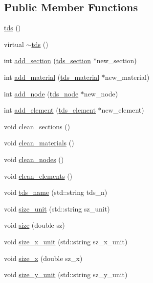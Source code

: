 \subsection*{Public Member Functions}
\begin{DoxyCompactItemize}
\item 
\hyperlink{classtds_a95c4027805a390a3031e9f52c08b89f0}{tds} ()
\item 
virtual \hyperlink{classtds_a192a8e8e17858b5408ba861b5dbfda82}{$\sim$tds} ()
\item 
int \hyperlink{classtds_abf92c8206a518017c40b9ab90eb5deb7}{add\+\_\+section} (\hyperlink{classtds__section}{tds\+\_\+section} $\ast$new\+\_\+section)
\item 
int \hyperlink{classtds_a105e3ea7b76d2da010923997324d1ec5}{add\+\_\+material} (\hyperlink{classtds__material}{tds\+\_\+material} $\ast$new\+\_\+material)
\item 
int \hyperlink{classtds_ab2be727bb6fb9ef9d880a62f5daabf32}{add\+\_\+node} (\hyperlink{classtds__node}{tds\+\_\+node} $\ast$new\+\_\+node)
\item 
int \hyperlink{classtds_aaf8d4e16284b4ac180b75828e2383ead}{add\+\_\+element} (\hyperlink{classtds__element}{tds\+\_\+element} $\ast$new\+\_\+element)
\item 
void \hyperlink{classtds_ad3be7939df63ea2147cb366504402950}{clean\+\_\+sections} ()
\item 
void \hyperlink{classtds_a9e124ba1f8612c881488915d4c7b1c5c}{clean\+\_\+materials} ()
\item 
void \hyperlink{classtds_ab225f20bb630a653f97de352c7f0fb99}{clean\+\_\+nodes} ()
\item 
void \hyperlink{classtds_a094622b47f168c579828e9c6743d5be7}{clean\+\_\+elements} ()
\item 
void \hyperlink{classtds_a4360dd60cf389359a50440d00d21b41f}{tds\+\_\+name} (std\+::string tds\+\_\+n)
\item 
void \hyperlink{classtds_a0ef1c70e8139e2f59d0234679e630346}{size\+\_\+unit} (std\+::string sz\+\_\+unit)
\item 
void \hyperlink{classtds_a409d0e3f35ba795307398c6ff60f2fc9}{size} (double sz)
\item 
void \hyperlink{classtds_a07deb94fcc9d489bfcdfbe7af2675fa4}{size\+\_\+x\+\_\+unit} (std\+::string sz\+\_\+x\+\_\+unit)
\item 
void \hyperlink{classtds_ab2982b1b1094353ceb63256ddc65de81}{size\+\_\+x} (double sz\+\_\+x)
\item 
void \hyperlink{classtds_a7824c39a088be0ba8c2c2fc95f292bf5}{size\+\_\+y\+\_\+unit} (std\+::string sz\+\_\+y\+\_\+unit)

\end{DoxyCompactItemize}
